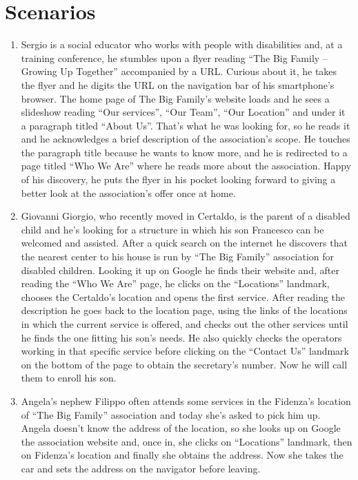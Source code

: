 %
%
\chapter{Scenarios}
%
%
\begin{enumerate}


\item Sergio is a social educator who works with people with disabilities and, at a training conference, he stumbles upon a flyer reading “The Big Family – Growing Up Together” accompanied by a URL. Curious about it, he takes the flyer and he digits the URL on the navigation bar of his smartphone’s browser. The home page of The Big Family’s website loads and he sees a slideshow reading “Our services”, “Our Team”, “Our Location” and under it a paragraph titled “About Us”. That’s what he was looking for, so he reads it and he acknowledges a brief description of the association’s scope. He touches the paragraph title because he wants to know more, and he is redirected to a page titled “Who We Are” where he reads more about the association. Happy of his discovery, he puts the flyer in his pocket looking forward to giving a better look at the association’s offer once at home.
\item Giovanni Giorgio, who recently moved in Certaldo, is the parent of a disabled child and he’s looking for a structure in which his son Francesco can be welcomed and assisted. After a quick search on the internet he discovers that the nearest center to his house is run by “The Big Family” association for disabled children. Looking it up on Google he finds their website and, after reading the “Who We Are” page, he clicks on the “Locations” landmark, chooses the Certaldo’s location and opens the first service. After reading the description he goes back to the location page, using the links of the locations in which the current service is offered, and checks out the other services until he finds the one fitting his son’s needs. He also quickly checks the operators working in that specific service before clicking on the “Contact Us” landmark on the bottom of the page to obtain the secretary’s number. Now he will call them to enroll his son.
\item Angela’s nephew Filippo often attends some services in the Fidenza’s location of “The Big Family” association and today she’s asked to pick him up. Angela doesn’t know the address of the location, so she looks up on Google the association website and, once in, she clicks on “Locations” landmark, then on Fidenza’s location and finally she obtains the address. Now she takes the car and sets the address on the navigator before leaving.
\end{enumerate}%
